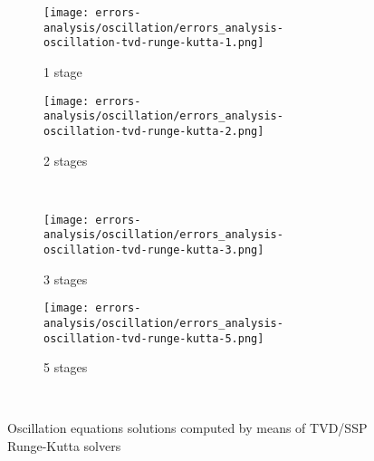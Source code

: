 \begin{figure}[!ht]
  \centering
  \begin{subfigure}[b]{0.45\textwidth}
    \centering
    \texttt{[image: errors-analysis/oscillation/errors\_analysis-oscillation-tvd-runge-kutta-1.png]}
    \caption{1 stage}\label{fig:results-oscillation-tvd-runge-kutta-1}
  \end{subfigure}\quad%
  \begin{subfigure}[b]{0.45\textwidth}
    \centering
    \texttt{[image: errors-analysis/oscillation/errors\_analysis-oscillation-tvd-runge-kutta-2.png]}
    \caption{2 stages}\label{fig:results-oscillation-tvd-runge-kutta-2}
  \end{subfigure}\\
  \begin{subfigure}[b]{0.45\textwidth}
    \centering
    \texttt{[image: errors-analysis/oscillation/errors\_analysis-oscillation-tvd-runge-kutta-3.png]}
    \caption{3 stages}\label{fig:results-oscillation-tvd-runge-kutta-3}
  \end{subfigure}\quad%
  \begin{subfigure}[b]{0.45\textwidth}
    \centering
    \texttt{[image: errors-analysis/oscillation/errors\_analysis-oscillation-tvd-runge-kutta-5.png]}
    \caption{5 stages}\label{fig:results-oscillation-tvd-runge-kutta-5}
  \end{subfigure}\\
  \caption{Oscillation equations solutions computed by means of TVD/SSP Runge-Kutta solvers}\label{fig:results-oscillation-tvd-runge-kutta}
\end{figure}

